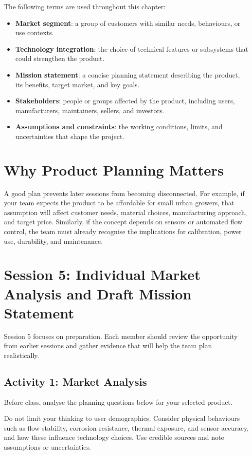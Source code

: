 The following terms are used throughout this chapter:
\begin{itemize}
    \item \textbf{Market segment}: a group of customers with similar needs, behaviours, or use contexts.
    \item \textbf{Technology integration}: the choice of technical features or subsystems that could strengthen the product.
    \item \textbf{Mission statement}: a concise planning statement describing the product, its benefits, target market, and key goals.
    \item \textbf{Stakeholders}: people or groups affected by the product, including users, manufacturers, maintainers, sellers, and investors.
    \item \textbf{Assumptions and constraints}: the working conditions, limits, and uncertainties that shape the project.
\end{itemize}

\section{Why Product Planning Matters}

A good plan prevents later sessions from becoming disconnected. For example, if your team expects the product to be affordable for small urban growers, that assumption will affect customer needs, material choices, manufacturing approach, and target price. Similarly, if the concept depends on sensors or automated flow control, the team must already recognise the implications for calibration, power use, durability, and maintenance.

\section{Session 5: Individual Market Analysis and Draft Mission Statement}

Session 5 focuses on preparation. Each member should review the opportunity from earlier sessions and gather evidence that will help the team plan realistically.

\subsection{Activity 1: Market Analysis}

Before class, analyse the planning questions below for your selected product.

\begin{tcolorbox}[title=Hint]
Do not limit your thinking to user demographics. Consider physical behaviours such as flow stability, corrosion resistance, thermal exposure, and sensor accuracy, and how these influence technology choices. Use credible sources and note assumptions or uncertainties.
\end{tcolorbox}



